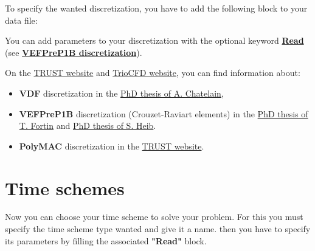To specify the wanted discretization, you have to add the following block to your data file:

    \begin{center}
    \end{center}

You can add parameters to your discretization with the optional keyword \href{\REFERENCEMANUAL\#read}{\textbf{Read}} (see \href{\REFERENCEMANUAL\#vefprep1b}{\textbf{VEFPreP1B discretization}}).

On the \href{https://cea-trust-platform.github.io/}{TRUST website} and \href{https://triocfd.cea.fr}{TrioCFD website}, you can find information about:
\begin{itemize}
\item \textbf{VDF} discretization in the \href{https://triocfd.cea.fr/Documents/DOCS THESES/these_chatelain_2004.pdf}{PhD thesis of A. Chatelain},
\item \textbf{VEFPreP1B} discretization (Crouzet-Raviart elements) in the \href{https://triocfd.cea.fr/Documents/DOCS THESES/these_fortin_2006.pdf}{PhD thesis of T. Fortin} and \href{https://triocfd.cea.fr/Documents/DOCS THESES/These_Heib_2003.pdf}{PhD thesis of S. Heib}.
\item \textbf{PolyMAC} discretization in the \href{https://cea-trust-platform.github.io/classes/discretizations/}{TRUST website}.
\end{itemize}


\section{Time schemes}
Now you can choose your time scheme to solve your problem. For this you must
specify the time scheme type wanted and give it a name. 
then you have to specify its parameters by filling the associated \textbf{"Read"} block.

    \begin{center}
    \end{center}

